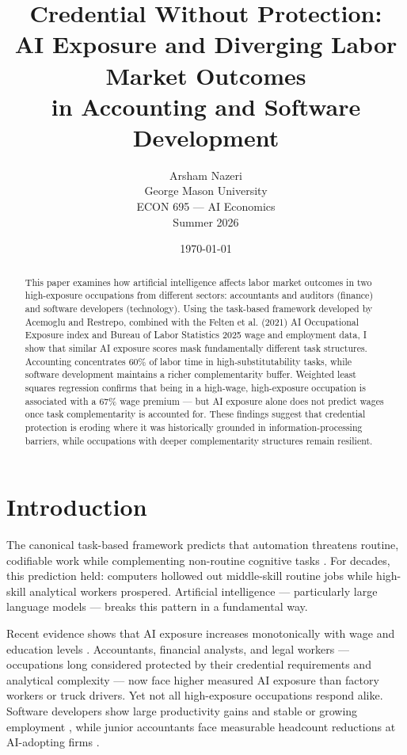 \documentclass[12pt]{article}
\title{
    \textbf{Credential Without Protection: \\
    AI Exposure and Diverging Labor Market Outcomes \\
    in Accounting and Software Development}
}
\author{
    Arsham Nazeri \\
    \small George Mason University \\
    \small ECON 695 --- AI Economics \\
    \small Summer 2026
}
\date{\today}
\begin{document}
\maketitle

\begin{abstract}
This paper examines how artificial intelligence affects labor market 
outcomes in two high-exposure occupations from different sectors: 
accountants and auditors (finance) and software developers (technology). 
Using the task-based framework developed by Acemoglu and Restrepo, 
combined with the Felten et al. (2021) AI Occupational Exposure index 
and Bureau of Labor Statistics 2025 wage and employment data, I show 
that similar AI exposure scores mask fundamentally different task 
structures. Accounting concentrates 60\% of labor time in 
high-substitutability tasks, while software development maintains a 
richer complementarity buffer. Weighted least squares regression 
confirms that being in a high-wage, high-exposure occupation is 
associated with a 67\% wage premium --- but AI exposure alone does 
not predict wages once task complementarity is accounted for. These 
findings suggest that credential protection is eroding where it was 
historically grounded in information-processing barriers, while 
occupations with deeper complementarity structures remain resilient.
\end{abstract}

\newpage

\section{Introduction}

The canonical task-based framework predicts that automation threatens 
routine, codifiable work while complementing non-routine cognitive 
tasks \citep{autor2003}. For decades, this prediction held: computers 
hollowed out middle-skill routine jobs while high-skill analytical 
workers prospered. Artificial intelligence --- particularly large 
language models --- breaks this pattern in a fundamental way.

Recent evidence shows that AI exposure increases monotonically with 
wage and education levels \citep{webb2019, eloundou2023}. Accountants, 
financial analysts, and legal workers --- occupations long considered 
protected by their credential requirements and analytical complexity --- 
now face higher measured AI exposure than factory workers or truck 
drivers. Yet not all high-exposure occupations respond alike. Software 
developers show large productivity gains and stable or growing 
employment \citep{peng2023, baird2026}, while junior accountants face 
measurable headcount reductions at AI-adopting firms \citep{fedyk2022}.
\end{document}
